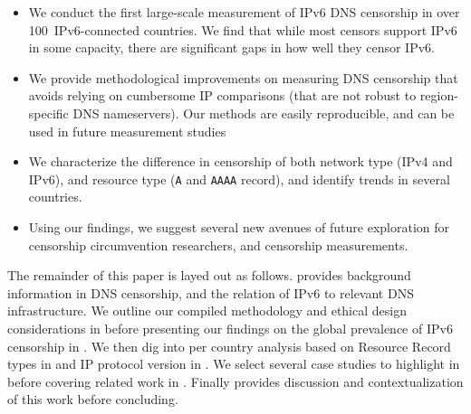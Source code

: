 \begin{itemize}
    \item
    We conduct the first large-scale measurement of IPv6 DNS censorship in
    over 100~IPv6-connected countries. %
    We find that while most censors support IPv6 in some capacity, there are
    significant gaps in how well they censor IPv6.


    \item We provide methodological improvements on measuring DNS censorship
    that avoids relying on cumbersome IP comparisons (that are not
    robust to region-specific DNS nameservers). Our methods are easily
    reproducible, and can be used in future measurement studies

    \item We characterize the difference in censorship of both network type
    (IPv4 and IPv6), and resource type ({\tt A} and {\tt AAAA} record), and
    identify trends in several countries.

    \item Using our findings, we suggest several new avenues of future
    exploration for censorship circumvention researchers, and censorship
    measurements.

\end{itemize}


The remainder of this paper is layed out as follows.  provides
background information in DNS censorship, and the relation of IPv6 to relevant DNS
infrastructure. We outline our compiled methodology and ethical design
considerations in  before presenting our findings on the
global prevalence of IPv6 censorship in . We then dig into
per country analysis based on Resource Record types in  and
IP protocol version in . We select several case studies
to highlight in  before covering related work in
. Finally  provides discussion and
contextualization of this work before concluding.


